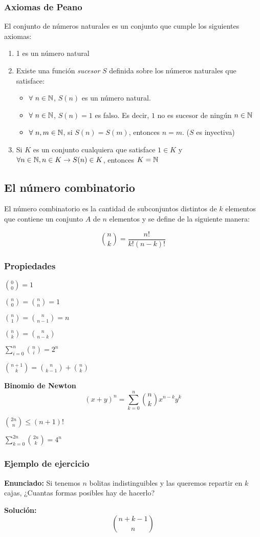 \subsubsection{Axiomas de Peano}
El conjunto de números naturales es un conjunto que cumple los siguientes axiomas:
\begin{enumerate}
    \item 1 es un número natural
    \item Existe una función \textit{sucesor} $S$ definida sobre los números naturales que satisface:
    \begin{itemize}
        \item $\forall~n\in\mathbb{N}$, $S(n)$ es un número natural.
        \item $\forall~n\in\mathbb{N}$, $S(n) = 1$ es falso. Es decir, $1$ no es sucesor de ningún $n\in\mathbb{N}$
        \item $\forall~n,m\in\mathbb{N}$, si $S(n) = S(m)$, entonces $n=m$. ($S$ es inyectiva)
    \end{itemize}
    \item Si $K$ es un conjunto cualquiera que satisface $1\in K$ y $\forall n\in\mathbb{N}, n\in K\to S(n)\in K$, entonces $K =\mathbb{N}$
\end{enumerate}
\subsection{El número combinatorio}
El número combinatorio es la cantidad de subconjuntos distintos de $k$ elementos que contiene un conjunto $A$ de $n$ elementos y se define de la siguiente manera:

$$\binom{n}{k} = \frac{n!}{k!(n-k)!}$$

\subsubsection{Propiedades}

\begin{itemize}
    \begin{multicols}{2}
    \item $\binom{0}{0} = 1$
    \item $\binom{n}{0} = \binom{n}{n} = 1$
    \item $\binom{n}{1} = \binom{n}{n-1} = n$
    \item $\binom{n}{k} = \binom{n}{n-k}$
    \item $\sum_{i=0}^{n}\binom{n}{i} = 2^n$
    \item $\binom{n+1}{k} = \binom{n}{k-1} + \binom{n}{k}$
    \item \textbf{Binomio de Newton} $$(x+y)^n = \sum_{k=0}^{n}\binom{n}{k}x^{n-k}y^{k}$$
    \item $\binom{2n}{n}\leq(n+1)!$
    \item $\sum_{k=0}^{2n}\binom{2n}{k} = 4^n$
    \end{multicols}
\end{itemize}

\subsubsection{Ejemplo de ejercicio}
\textbf{Enunciado:} Si tenemos $n$ bolitas indistinguibles y las queremos repartir en $k$ cajas, ¿Cuantas formas posibles hay de hacerlo?

\textbf{Solución:}
\begin{equation*}
    \binom{n+k-1}{n}
\end{equation*}
